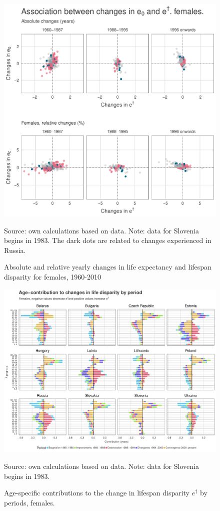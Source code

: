 \documentclass{article}
\begin{document}
\begin{figure}[h!]
\centering
\caption{Absolute and relative yearly changes in life expectancy and lifespan disparity for females, 1960-2010}
\begin{center}
\includegraphics[scale=.65]{Figures/changes_females.pdf}
\end{center}
Source: own calculations based on \citet{HMD} data. Note: data for Slovenia begins in 1983. The dark dots are related to changes experienced in Russia.
\end{figure}

\newpage

\begin{figure}[h!]
\caption{Age-specific contributions to the change in lifespan disparity $e^\dagger$ by periods, females.}
\centering
\begin{center}
\includegraphics[scale=.46]{Figures/Age_ed_decomp_Females.pdf}
\end{center}
Source: own calculations based on \citet{HMD} data. Note: data for Slovenia begins in 1983.
\end{figure}
\end{document}
